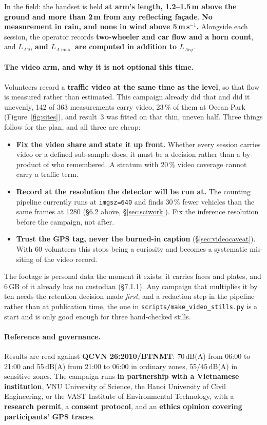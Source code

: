 \documentclass[11pt,a4paper]{article}
\newcommand{\dB}{\ensuremath{\,\mathrm{dB}}}
\newcommand{\pth}[1]{\texttt{\small #1}}
\begin{document}
In the field: the handset is held \textbf{at arm's length, 1.2--1.5\,m above the
ground and more than 2\,m from any reflecting façade}. \textbf{No measurement in
rain, and none in wind above 5\,m\,s$^{-1}$.} Alongside each session, the
operator records \textbf{two-wheeler and car flow and a horn count}, and
\textbf{$L_{A10}$ and $L_{A\max}$ are computed in addition to $L_{Aeq}$}.

\paragraph{The video arm, and why it is not optional this time.} Volunteers
record a \textbf{traffic video at the same time as the level}, so that flow is
measured rather than estimated. This campaign already did that and did it
unevenly, 142 of 363 measurements carry video, 23\,\% of them at Ocean Park
(Figure~\ref{fig:sites}), and result~3 was fitted on that thin, uneven half.
Three things follow for the plan, and all three are cheap:

\begin{itemize}
 \item \textbf{Fix the video share and state it up front.} Whether every
 session carries video or a defined sub-sample does, it must be a
 decision rather than a by-product of who remembered. A stratum with
 20\,\% video coverage cannot carry a traffic term.
 \item \textbf{Record at the resolution the detector will be run at.} The
 counting pipeline currently runs at \pth{imgsz=640} and finds 30\,\%
 fewer vehicles than the same frames at 1280 (§6.2 above,
 §\ref{sec:sciwork}). Fix the inference resolution before the campaign,
 not after.
 \item \textbf{Trust the GPS tag, never the burned-in caption}
 (§\ref{sec:videocaveat}). With 60 volunteers this stops being a
 curiosity and becomes a systematic mis-siting of the video record.
\end{itemize}

The footage is personal data the moment it exists: it carries faces and plates,
and 6\,GB of it already has no custodian (§7.1.1). Any campaign that multiplies
it by ten needs the retention decision made \emph{first}, and a redaction step
in the pipeline rather than at publication time, the one in
\pth{scripts/make\_video\_stills.py} is a start and is only good enough for
three hand-checked stills.

\paragraph{Reference and governance.} Results are read against \textbf{QCVN
26:2010/BTNMT}: 70\dB(A) from 06:00 to 21:00 and 55\dB(A) from 21:00 to 06:00 in
ordinary zones, 55/45\dB(A) in sensitive zones. The campaign runs \textbf{in
partnership with a Vietnamese institution}, VNU University of Science, the
Hanoi University of Civil Engineering, or the VAST Institute of Environmental
Technology, with a \textbf{research permit}, a \textbf{consent protocol}, and
an \textbf{ethics opinion covering participants' GPS traces}.
\end{document}
